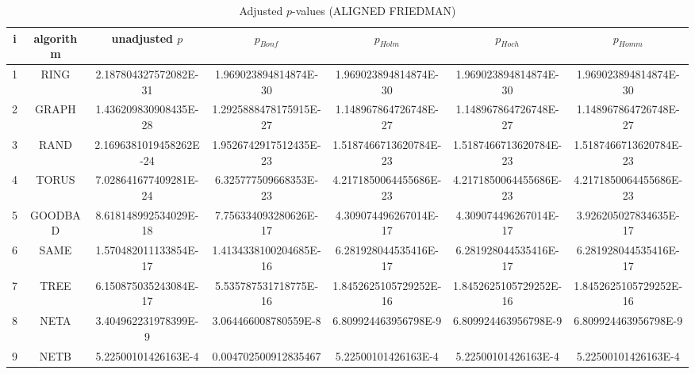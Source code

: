\documentclass[a4paper,10pt]{article}
\begin{document}
\begin{landscape}
\begin{table}[!htp]
\centering\scriptsize
\caption{Adjusted $p$-values (ALIGNED FRIEDMAN)}
\begin{tabular}{ccccccc}
i&algorithm&unadjusted $p$&$p_{Bonf}$&$p_{Holm}$&$p_{Hoch}$&$p_{Homm}$\\
\hline
1& RING&2.187804327572082E-31&1.969023894814874E-30&1.969023894814874E-30&1.969023894814874E-30&1.969023894814874E-30\\
2& GRAPH&1.436209830908435E-28&1.2925888478175915E-27&1.148967864726748E-27&1.148967864726748E-27&1.148967864726748E-27\\
3& RAND&2.1696381019458262E-24&1.9526742917512435E-23&1.5187466713620784E-23&1.5187466713620784E-23&1.5187466713620784E-23\\
4& TORUS&7.028641677409281E-24&6.325777509668353E-23&4.2171850064455686E-23&4.2171850064455686E-23&4.2171850064455686E-23\\
5& GOODBAD&8.618148992534029E-18&7.756334093280626E-17&4.309074496267014E-17&4.309074496267014E-17&3.926205027834635E-17\\
6& SAME&1.570482011133854E-17&1.4134338100204685E-16&6.281928044535416E-17&6.281928044535416E-17&6.281928044535416E-17\\
7& TREE&6.150875035243084E-17&5.535787531718775E-16&1.8452625105729252E-16&1.8452625105729252E-16&1.8452625105729252E-16\\
8& NETA&3.404962231978399E-9&3.064466008780559E-8&6.809924463956798E-9&6.809924463956798E-9&6.809924463956798E-9\\
9& NETB&5.22500101426163E-4&0.004702500912835467&5.22500101426163E-4&5.22500101426163E-4&5.22500101426163E-4\\
\hline
\end{tabular}
\end{table}


\end{landscape}
\end{document}
